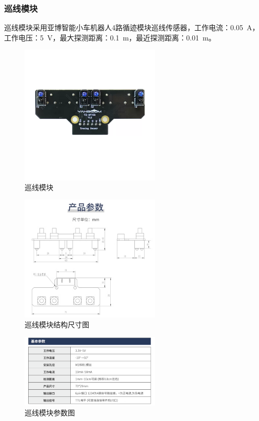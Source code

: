 \documentclass[10pt]{ctexart}
\begin{document}
\subsubsection{巡线模块}
巡线模块采用亚博智能小车机器人4路循迹模块巡线传感器，工作电流：\SI{0.05}{\ampere}，工作电压：\SI{5}{\volt}，最大探测距离：\SI{0.1}{\meter}，最近探测距离：\SI{0.01}{\meter}。

\begin{figure}[H]
    \centering
    \includegraphics[width=0.6\textwidth]{patrol/patrol.png}
    \caption{巡线模块}
    \label{fig:patrol}
\end{figure}

\begin{figure}[H]
    \centering
    \includegraphics[width=0.6\textwidth]{patrol/patrol_parameter1.png}
    \caption{巡线模块结构尺寸图}
    \label{fig:patrol_parameter1}
\end{figure}

\begin{figure}[H]
    \centering
    \includegraphics[width=0.6\textwidth]{patrol/patrol_parameter2.png}
    \caption{巡线模块参数图}
    \label{fig:patrol_parameter2}
\end{figure}
\clearpage
\end{document}

